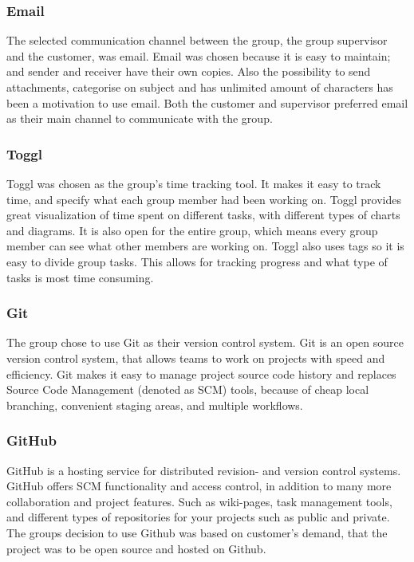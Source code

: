 \subsubsection{Email}
The selected communication channel between the group, the group supervisor and the customer, was email.
Email was chosen because it is easy to maintain; and sender and receiver have their own copies. Also the possibility to send attachments, categorise on subject and has unlimited amount of characters has been a motivation to use email. Both the customer and supervisor preferred email as their main channel to communicate with the group.  

\subsubsection{Toggl}
Toggl \cite{Toggl} was chosen as the group's time tracking tool. It makes it easy to track time, and specify what each group member had been working on. Toggl provides great visualization of time spent on different tasks, with different types of charts and diagrams. It is also open for the entire group, which means every group member can see what other members are working on. Toggl also uses tags so it is easy to divide group tasks. This allows for tracking progress and what type of tasks is most time consuming.  

\subsubsection{Git}
The group chose to use Git \cite{Git} as their version control system. Git is an open source version control system, that allows teams to work on projects with speed and efficiency. Git makes it easy to manage project source code history and replaces Source Code Management (denoted as SCM)  tools, because of cheap local branching, convenient staging areas, and multiple workflows. 

\subsubsection{GitHub}
\label{GitHub}
GitHub\cite{GitHub} is a hosting service for distributed revision- and version control systems. GitHub offers SCM functionality and access control, in addition to many more collaboration and project features. Such as wiki-pages, task management tools, and different types of repositories for your projects such as public and private. The groups decision to use Github was based on customer's demand, that the project was to be open source and hosted on Github. 

